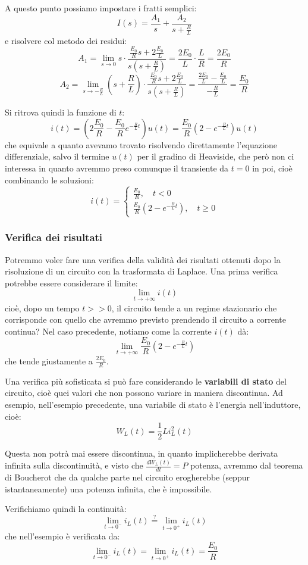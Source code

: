 \documentclass[a4paper,11pt]{article}
\begin{document}
A questo punto possiamo impostare i fratti semplici:
$$
I(s) = \frac{A_1}{s} + \frac{A_2}{s + \frac{R}{L}}
$$
e risolvere col metodo dei residui:
$$
A_1 = \lim_{s \rightarrow 0} s \cdot \frac{ \frac{E_0}{R}s + 2 \frac{E_0}{L} }{s\left(s+ \frac{R}{L}\right)} = \frac{2 E_0}{L} \cdot \frac{L}{R} = \frac{2 E_0}{R}
$$
$$
A_2 = \lim_{s \rightarrow -\frac{R}{L}} \left( s + \frac{R}{L} \right) \cdot \frac{ \frac{E_0}{R}s + 2 \frac{E_0}{L} }{s\left(s+ \frac{R}{L}\right)} = \frac{ \frac{2 E_0}{L} - \frac{E_0}{L} }{-\frac{R}{L}} = \frac{E_0}{R}
$$

Si ritrova quindi la funzione di $t$:
$$
i(t) = \left( 2\frac{E_0}{R} - \frac{E_0}{R} e^{-\frac{R}{L}t} \right) u(t) = \frac{E_0}{R} \left( 2 - e^{-\frac{R}{L}t} \right) u(t)
$$
che equivale a quanto avevamo trovato risolvendo direttamente l'equazione differenziale, salvo il termine $u(t)$ per il gradino di Heaviside, che però non ci interessa in quanto avremmo preso comunque il transiente da $t = 0$ in poi, cioè combinando le soluzioni:
\[
	i(t) = 
	\begin{cases}
		\frac{E_0}{R}, \quad t < 0 \\ 
		\frac{E_0}{R} \left( 2 - e^{-\frac{R}{L}t} \right), \quad t \geq 0
	\end{cases}
\]

\subsubsection{Verifica dei risultati}
Potremmo voler fare una verifica della validità dei risultati ottenuti dopo la risoluzione di un circuito con la trasformata di Laplace.
Una prima verifica potrebbe essere considerare il limite:
$$
\lim_{t \rightarrow +\infty} i(t)
$$
cioè, dopo un tempo $t >> 0$, il circuito tende a un regime stazionario che corrisponde con quello che avremmo previsto prendendo il circuito a corrente continua? 
Nel caso precedente, notiamo come la corrente $i(t)$ dà:
$$
\lim_{t \rightarrow +\infty} \frac{E_0}{R} \left( 2 - e^{-\frac{R}{L}t} \right)
$$
che tende giustamente a $\frac{2 E_0}{R}$.

Una verifica più sofisticata si può fare considerando le \textbf{variabili di stato} del circuito, cioè quei valori che non possono variare in maniera discontinua. 
Ad esempio, nell'esempio precedente, una variabile di stato è l'energia nell'induttore, cioè:
$$
W_L(t) = \frac{1}{2}L i_L^2(t)
$$

Questa non potrà mai essere discontinua, in quanto implicherebbe derivata infinita sulla discontinuità, e visto che $\frac{d W_L(t)}{dt} = P$ potenza, avremmo dal teorema di Boucherot che da qualche parte nel circuito erogherebbe (seppur istantaneamente) una potenza infinita, che è impossibile.

Verifichiamo quindi la continuità:
$$
\lim_{t \rightarrow 0^-} i_L(t) \stackrel{?}{=} \lim_{t \rightarrow 0^+} i_L(t)
$$
che nell'esempio è verificata da:
$$
\lim_{t \rightarrow 0^-} i_L(t) = \lim_{t \rightarrow 0^+} i_L(t) = \frac{E_0}{R}
$$
\end{document}
